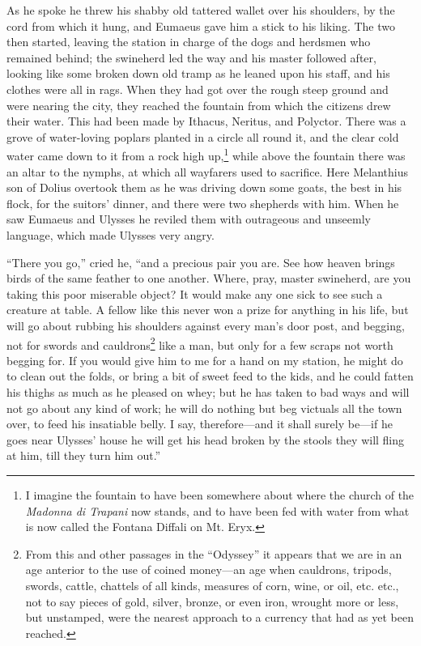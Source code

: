As he spoke he threw his shabby old tattered wallet over his shoulders, by the
cord from which it hung, and Eumaeus gave him a stick to his liking. The two
then started, leaving the station in charge of the dogs and herdsmen who
remained behind; the swineherd led the way and his master followed after,
looking like some broken down old tramp as he leaned upon his staff, and his
clothes were all in rags. When they had got over the rough steep ground and
were nearing the city, they reached the fountain from which the citizens drew
their water. This had been made by Ithacus, Neritus, and Polyctor. There was a
grove of water-loving poplars planted in a circle all round it, and the clear
cold water came down to it from a rock high up,\footnote{I imagine the fountain to have been somewhere about where the church of the
\emph{Madonna di Trapani} now stands, and to have been fed with water from
what is now called the Fontana Diffali on Mt. Eryx.} while above the fountain there was
an altar to the nymphs, at which all wayfarers used to sacrifice. Here
Melanthius son of Dolius overtook them as he was driving down some goats, the
best in his flock, for the suitors’ dinner, and there were two shepherds with
him. When he saw Eumaeus and Ulysses he reviled them with outrageous and
unseemly language, which made Ulysses very angry.

“There you go,” cried he, “and a precious pair you are. See how heaven brings
birds of the same feather to one another. Where, pray, master swineherd, are
you taking this poor miserable object? It would make any one sick to see such a
creature at table. A fellow like this never won a prize for anything in his
life, but will go about rubbing his shoulders against every man’s door post,
and begging, not for swords and cauldrons\footnote{From this and other passages in the “Odyssey” it appears that we are in an
age anterior to the use of coined money—an age when cauldrons, tripods,
swords, cattle, chattels of all kinds, measures of corn, wine, or oil, etc.
etc., not to say pieces of gold, silver, bronze, or even iron, wrought more or
less, but unstamped, were the nearest approach to a currency that had as yet
been reached.} like a man, but only for a few
scraps not worth begging for. If you would give him to me for a hand on my
station, he might do to clean out the folds, or bring a bit of sweet feed to
the kids, and he could fatten his thighs as much as he pleased on whey; but he
has taken to bad ways and will not go about any kind of work; he will do
nothing but beg victuals all the town over, to feed his insatiable belly. I
say, therefore—and it shall surely be—if he goes near Ulysses’ house he will
get his head broken by the stools they will fling at him, till they turn him
out.”

